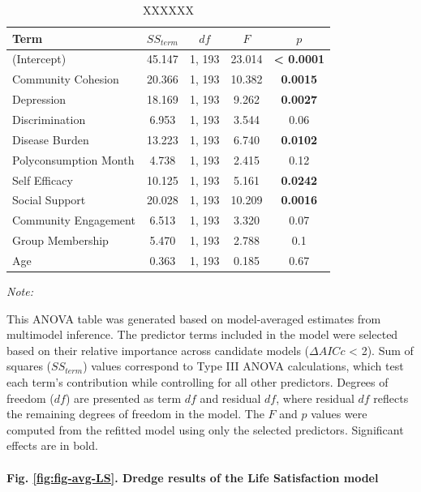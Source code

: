 \documentclass[
  bookmarksnumbered]{article}
\begin{document}
\begin{table}[H]
\centering
\caption{\label{tab:tab-avg-LS}XXXXXX}
\centering
\begin{threeparttable}
\begin{tabular}[t]{lcccc}
\toprule
Term & $SS_{term}$ & $df$ & $F$ & $p$\\
\midrule
(Intercept) & 45.147 & 1, 193 & 23.014 & \textbf{< 0.0001}\\
Community Cohesion & 20.366 & 1, 193 & 10.382 & \textbf{0.0015}\\
Depression & 18.169 & 1, 193 & 9.262 & \textbf{0.0027}\\
Discrimination & 6.953 & 1, 193 & 3.544 & 0.06\\
Disease Burden & 13.223 & 1, 193 & 6.740 & \textbf{0.0102}\\
Polyconsumption Month & 4.738 & 1, 193 & 2.415 & 0.12\\
Self Efficacy & 10.125 & 1, 193 & 5.161 & \textbf{0.0242}\\
Social Support & 20.028 & 1, 193 & 10.209 & \textbf{0.0016}\\
Community Engagement & 6.513 & 1, 193 & 3.320 & 0.07\\
Group Membership & 5.470 & 1, 193 & 2.788 & 0.1\\
Age & 0.363 & 1, 193 & 0.185 & 0.67\\
\bottomrule
\end{tabular}
\begin{tablenotes}[para]
\item \textit{Note: } 
\item This ANOVA table was generated based on model-averaged estimates from 
      multimodel inference. The predictor terms included in the model were selected based on 
      their relative importance across candidate models ($\Delta AICc$ < 2). 
      Sum of squares ($SS_{term}$) values correspond to Type III ANOVA calculations, 
      which test each term's contribution while controlling for all other predictors. 
      Degrees of freedom ($df$) are presented as term $df$ and residual $df$, where residual 
      $df$ reflects the remaining degrees of freedom in the model. The $F$ and $p$ values were
      computed from the refitted model using only the selected predictors.
      Significant effects are in bold.
\end{tablenotes}
\end{threeparttable}
\end{table}

\paragraph{Fig. \ref{fig:fig-avg-LS}. Dredge results of the Life Satisfaction model}\label{fig.-reffigfig-avg-ls.-dredge-results-of-the-life-satisfaction-model}
\end{document}
